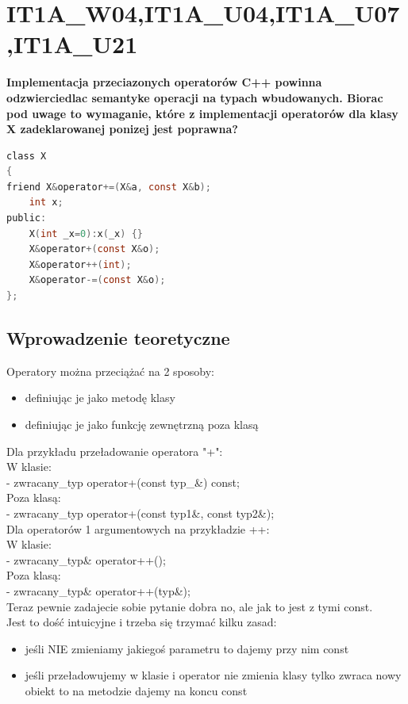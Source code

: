 
\section{IT1A\_W04,IT1A\_U04,IT1A\_U07,IT1A\_U21}
\textbf{Implementacja przeciazonych operatorów C++ powinna odzwierciedlac semantyke operacji na typach wbudowanych. Biorac pod uwage to wymaganie, które z implementacji operatorów dla klasy X zadeklarowanej ponizej jest poprawna? }
\begin{lstlisting}[language=c]
class X
{
friend X&operator+=(X&a, const X&b);
	int x;
public:
	X(int _x=0):x(_x) {}
	X&operator+(const X&o);
	X&operator++(int);
	X&operator-=(const X&o);
};
\end{lstlisting}

\subsection{Wprowadzenie teoretyczne}

Operatory można przeciążać na 2 sposoby:
\begin{itemize}
	\item definiując je jako metodę klasy
	\item definiując je jako funkcję zewnętrzną poza klasą
\end{itemize}
	
Dla przykładu przeładowanie operatora "+":\\
W klasie:\\
- zwracany\_typ operator+(const typ\_\&) const;\\
Poza klasą:\\
- zwracany\_typ operator+(const typ1\&, const typ2\&);\\

Dla operatorów 1 argumentowych na przykładzie ++:\\
W klasie:\\
- zwracany\_typ\& operator++();\\
Poza klasą:\\
- zwracany\_typ\& operator++(typ\&);\\

Teraz pewnie zadajecie sobie pytanie dobra no, ale jak to jest z tymi const. \\
Jest to dość intuicyjne i trzeba się trzymać kilku zasad:
\begin{itemize}
	\item jeśli NIE zmieniamy jakiegoś parametru to dajemy przy nim const
	\item jeśli przeładowujemy w klasie i operator nie zmienia klasy tylko zwraca nowy obiekt to na metodzie dajemy na koncu const
\end{itemize}


